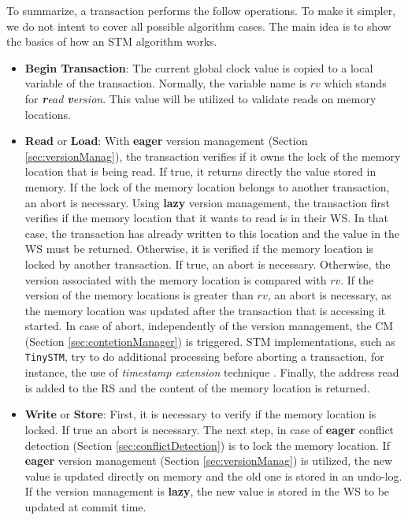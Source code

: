 To summarize, a transaction performs the follow operations. To make it simpler, we do not intent to cover all possible algorithm cases. The main idea is to show the basics of how an STM algorithm works.

\begin{itemize}
	\item \textbf{Begin Transaction}: The current global clock value is copied to a local variable of the transaction. Normally, the variable name is $rv$ which stands for \textit{\textbf{r}ead \textbf{v}ersion}. This value will be utilized to validate reads on memory locations.
	
	\item \textbf{Read} or \textbf{Load}: 	With \textbf{eager} version management (Section \ref{sec:versionManag}), the transaction verifies if it owns the lock of the memory location that is being read. If true, it returns directly the value stored in memory. If the lock of the memory location belongs to another transaction, an abort is necessary.  Using \textbf{lazy} version management, the transaction first verifies if the memory location that it wants to read is in their WS. In that case, the transaction has already written to this location and the value in the WS must be returned. 
Otherwise, it is verified if the memory location is locked by another transaction. If true, an abort is necessary. Otherwise, the version associated with the memory location is compared with $rv$. If the version of the memory locations is greater than $rv$, an abort is necessary, as the memory location was updated after the transaction that is accessing it started. In case of abort, independently of the version management, the CM (Section \ref{sec:contetionManager}) is triggered. STM implementations, such as \texttt{TinySTM}, try to do additional processing before aborting a transaction, for instance, the use of \textit{timestamp extension} technique \cite{Riegel:2006}.
Finally, the address read is added to the RS and the content of the memory location is returned.
	
	\item \textbf{Write} or \textbf{Store}: 
First, it is necessary to verify if the memory location is locked. If true an abort is necessary.
The next step, in case of \textbf{eager} conflict detection (Section \ref{sec:conflictDetection}) is to lock the memory location.
If \textbf{eager} version management (Section \ref{sec:versionManag}) is utilized, the new value is updated directly on memory and the old one is stored in an undo-log. If the version management is \textbf{lazy}, the new value is stored in the WS to be updated at commit time.
	

\end{itemize}
